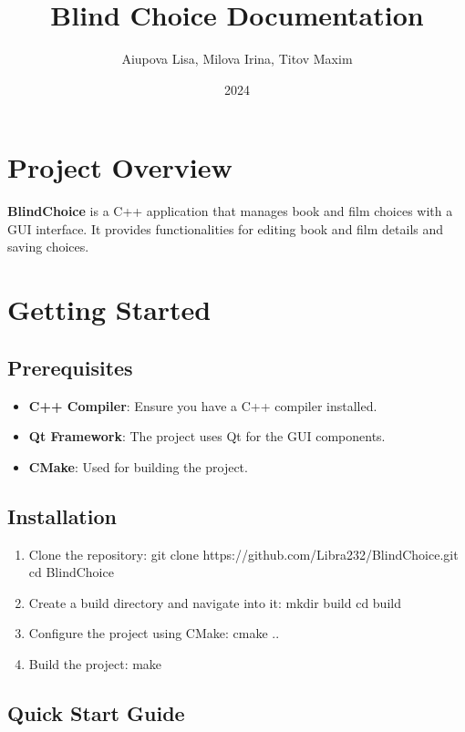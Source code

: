 \documentclass{article}
\title{Blind Choice Documentation}
\author{Aiupova Lisa,
Milova Irina,
Titov Maxim}
\date{2024}
\begin{document}
\maketitle

\tableofcontents

\section{Project Overview}

\textbf{BlindChoice}
is a C++ application that manages book and film choices with a GUI interface. It provides functionalities for editing book and film details and saving choices.



\section{Getting Started}


\subsection{Prerequisites}

\begin{itemize}
    \item \textbf{C++ Compiler}:
    Ensure you have a C++ compiler installed.
    \item \textbf{Qt Framework}:
    The project uses Qt for the GUI components.
    \item \textbf{CMake}:
    Used for building the project.
\end{itemize}


\subsection{Installation}

\begin{enumerate}
    \item Clone the repository:
    git clone https://github.com/Libra232/BlindChoice.git
    cd BlindChoice
    \item Create a build directory and navigate into it:
    mkdir build
    cd build
    \item Configure the project using CMake:
    cmake ..
    \item Build the project:
    make
\end{enumerate}


\subsection{Quick Start Guide}
\end{document}
